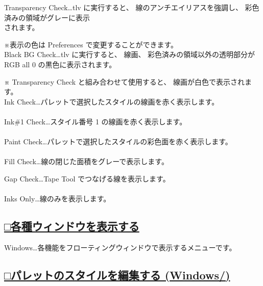 \documentclass[a4paper,10pt]{article}
\begin{document}
\noindent Transparency Check…tlv に実行すると、 線のアンチエイリアスを強調し、 彩色済みの領域がグレーに表示\\
されます。\par
\footnotesize
\noindent ※表示の色は Preferences で変更することができます。\\[1em]
\normalsize Black BG Check…tlv に実行すると、 線画、 彩色済みの領域以外の透明部分が RGB all 0 の黒色に表示されます。\par
\footnotesize
\noindent ※ Transparency Check と組み合わせて使用すると、 線画が白色で表示されます。\\[1em]
\normalsize Ink Check…パレットで選択したスタイルの線画を赤く表示します。\\[-0.1em]
\\
Ink\#1 Check…スタイル番号 1 の線画を赤く表示します。\\[-0.1em]
\\
Paint Check…パレットで選択したスタイルの彩色面を赤く表示します。\\[-0.1em]
\\
Fill Check…線の閉じた面積をグレーで表示します。

\newpage

\noindent Gap Check…Tape Tool でつなげる線を表示します。\\[-0.1em]
\\
Inks Only…線のみを表示します。\\[1em]

\subsection*{\uline{□各種ウィンドウを表示する}}

\noindent Windows…各機能をフローティングウィンドウで表示するメニューです。\\[1em]

\subsection*{\uline{□パレットのスタイルを編集する (Windows/)}}
\end{document}
